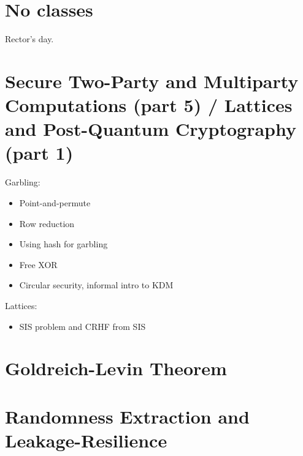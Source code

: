 \documentclass{llncs}
\begin{document}
\section{No classes}
Rector's day.

\section{Secure Two-Party and Multiparty Computations (part 5) / Lattices and Post-Quantum Cryptography (part 1)}
Garbling:
\begin{itemize}
	\item Point-and-permute
	\item Row reduction
	\item Using hash for garbling
	\item Free XOR
	\item Circular security, informal intro to KDM
\end{itemize}

Lattices:
\begin{itemize}
	\item SIS problem and CRHF from SIS
\end{itemize}

\section{Goldreich-Levin Theorem}

\section{Randomness Extraction and Leakage-Resilience}


\printbibliography %
\end{document}
